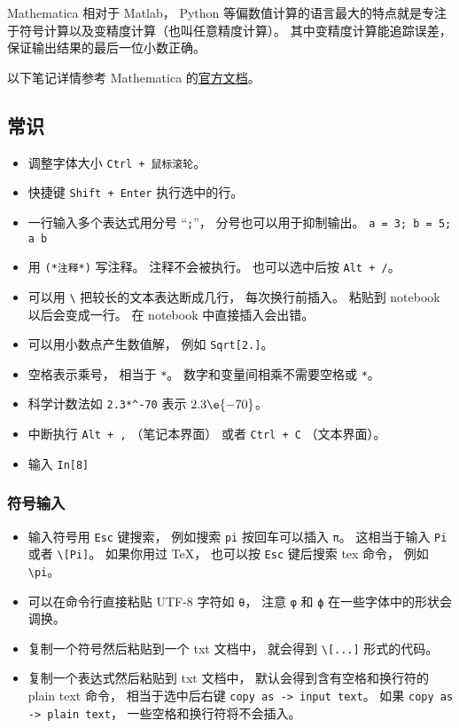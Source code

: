 

Mathematica 相对于 Matlab， Python 等偏数值计算的语言最大的特点就是专注于符号计算以及变精度计算（也叫任意精度计算）。 其中变精度计算能追踪误差， 保证输出结果的最后一位小数正确。

以下笔记详情参考 Mathematica 的\href{https://reference.wolfram.com/language/}{官方文档}。

\subsection{常识}
\begin{itemize}
\item 调整字体大小 \verb|Ctrl + 鼠标滚轮|。
\item 快捷键 \verb|Shift + Enter| 执行选中的行。
\item 一行输入多个表达式用分号 “\verb|;|”， 分号也可以用于抑制输出。 \verb|a = 3; b = 5; a b|
\item 用 \verb|(*注释*)| 写注释。 注释不会被执行。 也可以选中后按 \verb|Alt + /|。
\item 可以用 \verb|\| 把较长的文本表达断成几行， 每次换行前插入。 粘贴到 notebook 以后会变成一行。 在 notebook 中直接插入会出错。
\item 可以用小数点产生数值解， 例如 \verb|Sqrt[2.]|。
\item 空格表示乘号， 相当于 \verb|*|。 数字和变量间相乘不需要空格或 \verb|*|。
\item 科学计数法如 \verb|2.3*^-70| 表示 $2.3\e{-70}$。
\item 中断执行 \verb|Alt + ,| （笔记本界面） 或者 \verb|Ctrl + C| （文本界面）。
\item 输入 \verb|In[8]|
\end{itemize}

\subsubsection{符号输入}
\begin{itemize}
\item 输入符号用 \verb|Esc| 键搜索， 例如搜索 \verb|pi| 按回车可以插入 \verb|π|。 这相当于输入 \verb|Pi| 或者 \verb|\[Pi]|。 如果你用过 TeX， 也可以按 \verb|Esc| 键后搜索 tex 命令， 例如 \verb|\pi|。
\item 可以在命令行直接粘贴 UTF-8 字符如 \verb|θ|， 注意 \verb|φ| 和 \verb|ϕ| 在一些字体中的形状会调换。
\item 复制一个符号然后粘贴到一个 txt 文档中， 就会得到 \verb|\[...]| 形式的代码。
\item 复制一个表达式然后粘贴到 txt 文档中， 默认会得到含有空格和换行符的 plain text 命令， 相当于选中后右键 \verb|copy as -> input text|。 如果 \verb|copy as -> plain text|， 一些空格和换行符将不会插入。
\end{itemize}

